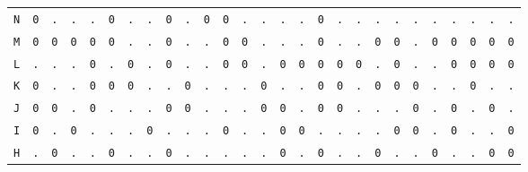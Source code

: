 \begin{figure}[H]
\begin{center}
{\begin{tabular}{c|cccccccccccccccccccccccccc}
				\texttt{N} & \texttt{0} & \texttt{.} & \texttt{.} & \texttt{.} & \texttt{0} & \texttt{.} & \texttt{.} & \texttt{0} & \texttt{.} & \texttt{0} & \texttt{0} & \texttt{.} & \texttt{.} & \texttt{.} & \texttt{.} & \texttt{0} & \texttt{.} & \texttt{.} & \texttt{.} & \texttt{.} & \texttt{.} & \texttt{.} & \texttt{.} & \texttt{.} & \texttt{.} & \texttt{.} \\
				\texttt{M} & \texttt{0} & \texttt{0} & \texttt{0} & \texttt{0} & \texttt{0} & \texttt{.} & \texttt{.} & \texttt{0} & \texttt{.} & \texttt{.} & \texttt{0} & \texttt{0} & \texttt{.} & \texttt{.} & \texttt{.} & \texttt{0} & \texttt{.} & \texttt{.} & \texttt{0} & \texttt{0} & \texttt{.} & \texttt{0} & \texttt{0} & \texttt{0} & \texttt{0} & \texttt{0} \\
				\texttt{L} & \texttt{.} & \texttt{.} & \texttt{.} & \texttt{0} & \texttt{.} & \texttt{0} & \texttt{.} & \texttt{0} & \texttt{.} & \texttt{.} & \texttt{0} & \texttt{0} & \texttt{.} & \texttt{0} & \texttt{0} & \texttt{0} & \texttt{0} & \texttt{0} & \texttt{.} & \texttt{0} & \texttt{.} & \texttt{.} & \texttt{0} & \texttt{0} & \texttt{0} & \texttt{0} \\
				\texttt{K} & \texttt{0} & \texttt{.} & \texttt{.} & \texttt{0} & \texttt{0} & \texttt{0} & \texttt{.} & \texttt{.} & \texttt{0} & \texttt{.} & \texttt{.} & \texttt{.} & \texttt{0} & \texttt{.} & \texttt{.} & \texttt{0} & \texttt{0} & \texttt{.} & \texttt{0} & \texttt{0} & \texttt{0} & \texttt{.} & \texttt{.} & \texttt{0} & \texttt{.} & \texttt{.} \\
				\texttt{J} & \texttt{0} & \texttt{0} & \texttt{.} & \texttt{0} & \texttt{.} & \texttt{.} & \texttt{.} & \texttt{0} & \texttt{0} & \texttt{.} & \texttt{.} & \texttt{.} & \texttt{0} & \texttt{0} & \texttt{.} & \texttt{0} & \texttt{0} & \texttt{.} & \texttt{.} & \texttt{.} & \texttt{0} & \texttt{.} & \texttt{0} & \texttt{.} & \texttt{0} & \texttt{.} \\
				\texttt{I} & \texttt{0} & \texttt{.} & \texttt{0} & \texttt{.} & \texttt{.} & \texttt{.} & \texttt{0} & \texttt{.} & \texttt{.} & \texttt{.} & \texttt{0} & \texttt{.} & \texttt{.} & \texttt{0} & \texttt{0} & \texttt{.} & \texttt{.} & \texttt{.} & \texttt{.} & \texttt{0} & \texttt{0} & \texttt{.} & \texttt{0} & \texttt{.} & \texttt{.} & \texttt{0} \\
				\texttt{H} & \texttt{.} & \texttt{0} & \texttt{.} & \texttt{.} & \texttt{0} & \texttt{.} & \texttt{.} & \texttt{0} & \texttt{.} & \texttt{.} & \texttt{.} & \texttt{.} & \texttt{.} & \texttt{0} & \texttt{.} & \texttt{0} & \texttt{.} & \texttt{.} & \texttt{0} & \texttt{.} & \texttt{.} & \texttt{0} & \texttt{.} & \texttt{.} & \texttt{0} & \texttt{0} \\

\end{tabular}}
\end{center}
\end{figure}
